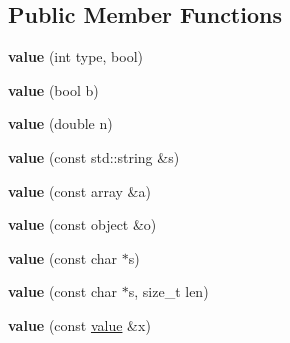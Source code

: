 \subsection*{Public Member Functions}
\begin{DoxyCompactItemize}
\item 
\hypertarget{classpicojson_1_1value_acd1d55ac7333a3e482e469b3d99fdf6e}{{\bfseries value} (int type, bool)}\label{classpicojson_1_1value_acd1d55ac7333a3e482e469b3d99fdf6e}

\item 
\hypertarget{classpicojson_1_1value_a43d8a33c3dbea0c5853bef4577a0d10e}{{\bfseries value} (bool b)}\label{classpicojson_1_1value_a43d8a33c3dbea0c5853bef4577a0d10e}

\item 
\hypertarget{classpicojson_1_1value_af19f6d5889d90e77e76af05aacaba321}{{\bfseries value} (double n)}\label{classpicojson_1_1value_af19f6d5889d90e77e76af05aacaba321}

\item 
\hypertarget{classpicojson_1_1value_aa4841f2dd8deeaffca7a225075b88da9}{{\bfseries value} (const std\-::string \&s)}\label{classpicojson_1_1value_aa4841f2dd8deeaffca7a225075b88da9}

\item 
\hypertarget{classpicojson_1_1value_a729e8f01d9bb4686daac82d0d3295afe}{{\bfseries value} (const array \&a)}\label{classpicojson_1_1value_a729e8f01d9bb4686daac82d0d3295afe}

\item 
\hypertarget{classpicojson_1_1value_a2b6beb88edf85e213893b805b354c87e}{{\bfseries value} (const object \&o)}\label{classpicojson_1_1value_a2b6beb88edf85e213893b805b354c87e}

\item 
\hypertarget{classpicojson_1_1value_a94f324d88fd16c1338fc9a228ec3dc3c}{{\bfseries value} (const char $\ast$s)}\label{classpicojson_1_1value_a94f324d88fd16c1338fc9a228ec3dc3c}

\item 
\hypertarget{classpicojson_1_1value_ae56da06e2b438f4425300a218150398d}{{\bfseries value} (const char $\ast$s, size\-\_\-t len)}\label{classpicojson_1_1value_ae56da06e2b438f4425300a218150398d}

\item 
\hypertarget{classpicojson_1_1value_a89a827eee72398d3678509cdd65c777d}{{\bfseries value} (const \hyperlink{classpicojson_1_1value}{value} \&x)}\label{classpicojson_1_1value_a89a827eee72398d3678509cdd65c777d}


\end{DoxyCompactItemize}
